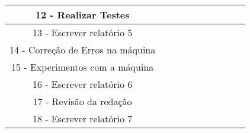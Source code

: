 \documentclass[journal]{IEEEtran}
\begin{document}
\begin{table}[!htbp]
\begin{tabular}{c|l|l|l|l|l|l|l|l|l|}
\multicolumn{1}{|c|}{12 - Realizar Testes}                                                                                    & \multicolumn{1}{c|}{}  & \multicolumn{1}{c|}{}  & \multicolumn{1}{c|}{}  & \multicolumn{1}{c|}{}  & \multicolumn{1}{c|}{}  & \multicolumn{1}{c|}{}  & \multicolumn{1}{c|}{}  & \multicolumn{1}{c|}{}  &                        \\ \hline
\multicolumn{1}{|c|}{13 - Escrever relatório 5}                                                                               &                        &                        &                        &                        &                        &                        &                        &                        &                        \\ \hline
\multicolumn{1}{|c|}{14 - Correção de Erros na máquina}                                                                       & \multicolumn{1}{c|}{}  & \multicolumn{1}{c|}{}  & \multicolumn{1}{c|}{}  & \multicolumn{1}{c|}{}  & \multicolumn{1}{c|}{}  & \multicolumn{1}{c|}{}  & \multicolumn{1}{c|}{}  & \multicolumn{1}{c|}{}  &                        \\ \hline
\multicolumn{1}{|c|}{15 - Experimentos com a máquina}                                                                         &                        &                        &                        &                        &                        &                        &                        &                        &                        \\ \hline
\multicolumn{1}{|c|}{16 - Escrever relatório 6}                                                                               &                        &                        &                        &                        &                        &                        &                        &                        &                        \\ \hline
\multicolumn{1}{|c|}{17 - Revisão da redação}                                                                                 &                        &                        &                        &                        &                        &                        &                        &                        &                        \\ \hline
\multicolumn{1}{|c|}{18 - Escrever relatório 7}                                                                               &                        &                        &                        &                        &                        &                        &                        &                        &                        \\ \hline

\end{tabular}
\end{table}
\end{document}
